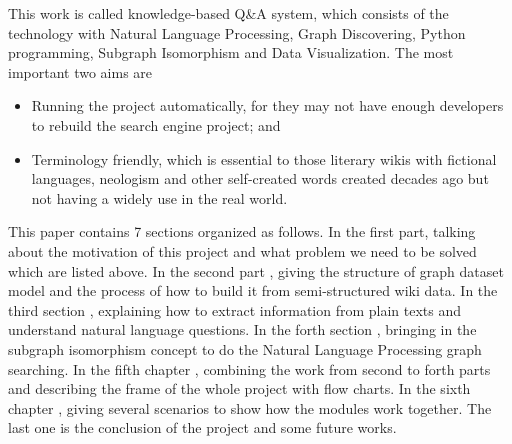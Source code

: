 This work is called knowledge-based Q\&A system, which consists of the technology with Natural Language Processing, Graph Discovering, Python programming, Subgraph Isomorphism and Data Visualization. The most important two aims are 
\begin{itemize}
	\item Running the project automatically, for they may not have enough developers to rebuild the search engine project; and
	\item Terminology friendly, which is essential to those literary wikis with fictional languages, neologism and other self-created words created decades ago but not having a widely use in the real world.
\end{itemize}
This paper contains 7 sections organized as follows. In the first  part, talking about the motivation of this project and what problem we need to be solved which are listed above. In the second part , giving the structure of graph dataset model and the process of how to build it from semi-structured wiki data. In the third section , explaining how to extract information from plain texts and understand natural language questions. In the forth section , bringing in the subgraph isomorphism concept to do the Natural Language Processing graph searching. In the fifth chapter , combining the work from second to forth parts and describing the frame of the whole project with flow charts. In the sixth chapter , giving several scenarios to show how the modules work together. The last one is the conclusion of the project and some future works.
